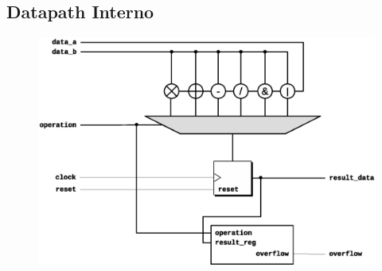     \subsection{Datapath Interno}
      \begin{figure}[H]
        \centering
        \includegraphics[width=\linewidth]{datapath/processing_datapath.eps}
      \end{figure}
    \newpage